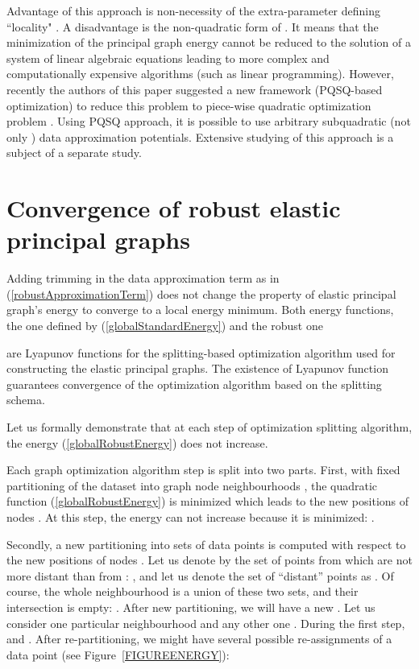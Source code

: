 \documentclass[graybox]{archivesofdatascience}
\begin{document}
Advantage of this approach is non-necessity of the extra-parameter defining ``locality" . A disadvantage is the non-quadratic form of . It means that the minimization of the principal graph energy cannot be reduced to the solution of a system of linear algebraic equations leading to more complex and computationally expensive algorithms (such as linear programming). However, recently the authors of this paper suggested a new framework (PQSQ-based optimization) to reduce this problem to piece-wise quadratic optimization problem \citep{Gorban2016NeuralNetworks}. Using PQSQ approach, it is possible to use arbitrary subquadratic (not only ) data approximation potentials. Extensive studying of this approach is a subject of a separate study.

\fi






\section{Convergence of robust elastic principal graphs}

Adding trimming in the data approximation term as in (\ref{robustApproximationTerm}) does not change the property of elastic principal graph's energy to converge to a local energy minimum. Both energy functions, the one defined by (\ref{globalStandardEnergy}) and the robust one



\noindent are Lyapunov functions for the splitting-based optimization algorithm used for constructing the elastic principal graphs. The existence of Lyapunov function guarantees convergence of the optimization algorithm based on the splitting schema.

Let us formally demonstrate that at each step of optimization splitting algorithm, the energy (\ref{globalRobustEnergy}) does not increase.

Each graph optimization algorithm step is split into two parts. First, with fixed partitioning of the dataset  into graph node neighbourhoods , the quadratic function (\ref{globalRobustEnergy}) is minimized which leads to the new positions of nodes . At this step, the energy  can not increase because it is minimized: .

Secondly, a new partitioning into sets  of data points  is computed with respect to the new positions of nodes . Let us denote by  the set of points from  which are not more distant than  from : , and let us denote the set of ``distant'' points as . Of course, the whole neighbourhood is a union of these two sets, and their intersection is empty: . After new partitioning, we will have a new . Let us consider one particular neighbourhood  and any other one . During the first step,  and . After re-partitioning, we might have several possible re-assignments of a data point   (see Figure~\ref{FIGUREENERGY}):
\end{document}
